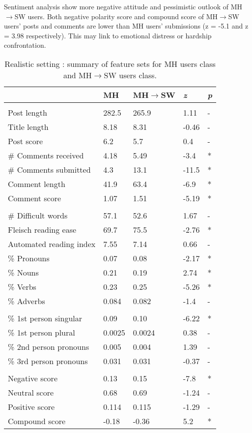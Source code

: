 Sentiment analysis show more negative attitude and pessimistic outlook of MH$\rightarrow$SW users. Both negative polarity score and compound score of MH$\rightarrow$SW users' posts and comments are lower than MH users' submissions (z = -5.1 and z = 3.98 respectively). This may link to emotional distress or hardship confrontation.\\
\begin{table}
\noindent\begin{tabularx}{\textwidth}{>{\hsize=0.4\textwidth}XXXXX}
\toprule
& MH  & MH$\rightarrow$SW & \textit{z} & \textit{p}\\
\midrule
\rowcolor{gray}
\multicolumn{5}{c}{Interaction} \\ 
Post length  & 282.5  & 265.9  & 1.11 & -\\
Title length  & 8.18  &  8.31  &  -0.46 & -\\
Post score  & 6.2 & 5.7   & 0.4 &  -\\
\# Comments received  & 4.18 & 5.49 & -3.4 & *\\
\# Comments submitted & 4.3 & 13.1 & -11.5 & *\\
Comment length & 41.9 & 63.4 & -6.9 &  * \\
Comment score & 1.07 & 1.51 & -5.19 & *\\
\rowcolor{gray}
\multicolumn{5}{c}{Linguistic structure} \\ 
\# Difficult words & 57.1 & 52.6 & 1.67 & -\\
Fleisch reading ease & 69.7 & 75.5 & -2.76 & *\\
Automated reading index & 7.55 & 7.14 & 0.66  & -\\
\% Pronouns  & 0.07 & 0.08 & -2.17  & *\\
\% Nouns & 0.21& 0.19 & 2.74  &  *\\
\% Verbs & 0.23 & 0.25 & -5.26  &  *\\
\% Adverbs & 0.084 & 0.082 & -1.4  &  -\\
\rowcolor{gray}
\multicolumn{5}{c}{Interpersonal awareness} \\ 
\% 1st person singular & 0.09 & 0.10 & -6.22 & *\\
\% 1st person plural & 0.0025 & 0.0024 & 0.38 & -\\
\% 2nd person pronouns & 0.005 & 0.004 & 1.39 &-\\
\% 3rd person pronouns & 0.031 & 0.031 & -0.37 & -\\
\rowcolor{gray}
\multicolumn{5}{c}{Sentiment analysis} \\
Negative score & 0.13 & 0.15 & -7.8 & *\\
Neutral score  & 0.68 & 0.69  & -1.24 & -\\
Positive score & 0.114 & 0.115 & -1.29 &-\\
Compound score & -0.18 & -0.36 & 5.2 & *\\
\bottomrule
\end{tabularx}
\caption{Realistic setting : summary of feature sets for MH users class and  MH$\rightarrow$SW users class.}
\label{tab:z_realisitc}
\end{table}
